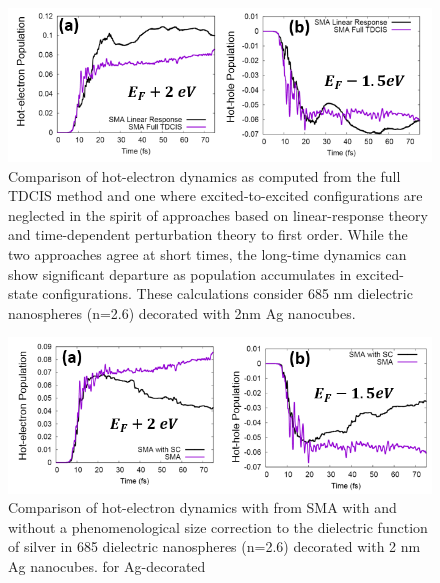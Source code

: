 \documentclass[journal=jpclcd,manuscript=suppinfo]{achemso}
\begin{document}
\begin{figure}
\begin{center}
\includegraphics[width=6in]{Ag_LR_vs_TDCIS.png}
\caption{Comparison of hot-electron dynamics as computed from the full TDCIS method and one where
excited-to-excited configurations are neglected in the spirit of approaches based on linear-response
theory and time-dependent perturbation theory to first order.  While the two approaches agree at short
times, the long-time dynamics can show significant departure as population accumulates
in excited-state configurations.  These calculations consider 685 nm dielectric nanospheres (n=2.6)
decorated with 2nm Ag nanocubes. }
\end{center}
\end{figure}


\begin{figure}
\begin{center}
\includegraphics[width=6in]{Ag_SC_Compare.png}
\caption{Comparison of hot-electron dynamics with from SMA with and without a phenomenological size
correction to the dielectric function of silver in 685 dielectric nanospheres (n=2.6) decorated with 2 nm Ag nanocubes.
for Ag-decorated  }
\end{center}
\end{figure}
\end{document}
